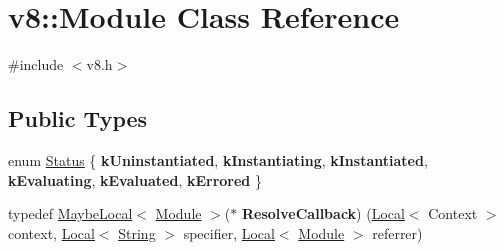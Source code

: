 \hypertarget{classv8_1_1Module}{}\section{v8\+:\+:Module Class Reference}
\label{classv8_1_1Module}


{\ttfamily \#include $<$v8.\+h$>$}

\subsection*{Public Types}
\begin{DoxyCompactItemize}
\item 
enum \mbox{\hyperlink{classv8_1_1Module_a9c2a22c9cb8e928d570c38648c648b7e}{Status}} \{ \newline
{\bfseries k\+Uninstantiated}, 
{\bfseries k\+Instantiating}, 
{\bfseries k\+Instantiated}, 
{\bfseries k\+Evaluating}, 
\newline
{\bfseries k\+Evaluated}, 
{\bfseries k\+Errored}
 \}
\item 
\mbox{\label{classv8_1_1Module_a49b31b9f2408284c0ce3c622b5e29027}} 
typedef \mbox{\hyperlink{classv8_1_1MaybeLocal}{Maybe\+Local}}$<$ \mbox{\hyperlink{classv8_1_1Module}{Module}} $>$($\ast$ {\bfseries Resolve\+Callback}) (\mbox{\hyperlink{classv8_1_1Local}{Local}}$<$ Context $>$ context, \mbox{\hyperlink{classv8_1_1Local}{Local}}$<$ \mbox{\hyperlink{classv8_1_1String}{String}} $>$ specifier, \mbox{\hyperlink{classv8_1_1Local}{Local}}$<$ \mbox{\hyperlink{classv8_1_1Module}{Module}} $>$ referrer)
\end{DoxyCompactItemize}
